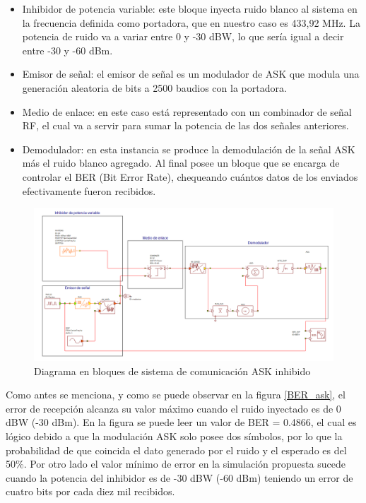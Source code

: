 \documentclass[12pt]{report}
\begin{document}
\begin{itemize}
    \item Inhibidor de potencia variable: este bloque inyecta ruido blanco al sistema en la frecuencia definida como portadora, que en nuestro 
    caso es 433,92 MHz. La potencia de ruido va a variar entre 0 y -30 dBW, lo que sería igual a decir entre -30 y -60 dBm. 
    \item Emisor de señal: el emisor de señal es un modulador de ASK que modula una generación aleatoria de bits a 2500 baudios con la portadora.
    \item Medio de enlace: en este caso está representado con un combinador de señal RF, el cual va a servir para sumar la potencia de las dos
    señales anteriores.
    \item Demodulador: en esta instancia se produce la demodulación de la señal ASK más el ruido blanco agregado. Al final posee un bloque que
    se encarga de controlar el BER (Bit Error Rate), chequeando cuántos datos de los enviados efectivamente fueron recibidos. 

\end{itemize}

\begin{figure}[htb]
	\centering
	\includegraphics[scale=0.37]{bloques_inh.png}
    \caption{Diagrama en bloques de sistema de comunicación ASK inhibido}
	\label{bloques_inh}
\end{figure}

Como antes se menciona, y como se puede observar en la figura \ref{BER_ask}, el error de recepción alcanza su valor máximo cuando el ruido 
inyectado es de 0 dBW (-30 dBm). En la figura se puede leer un valor de BER = 0.4866, el cual es lógico debido a que la modulación ASK solo 
posee dos símbolos, por lo que la probabilidad de que coincida el dato generado por el ruido y el esperado es del 50\%. Por otro lado el valor
mínimo de error en la simulación propuesta sucede cuando la potencia del inhibidor es de -30 dBW (-60 dBm) teniendo un error de cuatro bits 
por cada diez mil recibidos.
\end{document}

